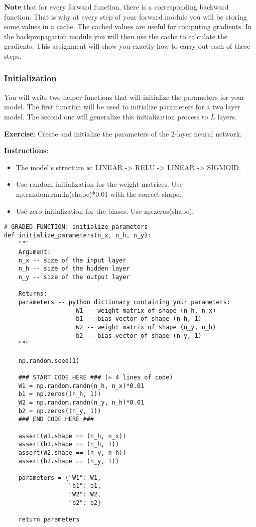 {\textbf {Note}} that for every forward function, there is a corresponding backward function. That is why at every step of your forward module you will be storing some values in a cache. The cached values are useful for computing gradients. In the backpropagation module you will then use the cache to calculate the gradients. This assignment will show you exactly how to carry out each of these steps.



\subsubsection{Initialization}

You will write two helper functions that will initialize the parameters for your model. The first function will be used to initialize parameters for a two layer model. The second one will generalize this initialization process to  $L$ layers.


{\textbf {Exercise}}: Create and initialize the parameters of the 2-layer neural network.

{\textbf {Instructions}}:
\begin{itemize}
\item The model's structure is: LINEAR -> RELU -> LINEAR -> SIGMOID.
\item Use random initialization for the weight matrices. Use np.random.randn(shape)*0.01 with the correct shape.
\item Use zero initialization for the biases. Use np.zeros(shape).
\end{itemize}

\begin{verbatim}
# GRADED FUNCTION: initialize_parameters
def initialize_parameters(n_x, n_h, n_y):
    """
    Argument:
    n_x -- size of the input layer
    n_h -- size of the hidden layer
    n_y -- size of the output layer
    
    Returns:
    parameters -- python dictionary containing your parameters:
                    W1 -- weight matrix of shape (n_h, n_x)
                    b1 -- bias vector of shape (n_h, 1)
                    W2 -- weight matrix of shape (n_y, n_h)
                    b2 -- bias vector of shape (n_y, 1)
    """
    
    np.random.seed(1)
    
    ### START CODE HERE ### (≈ 4 lines of code)
    W1 = np.random.randn(n_h, n_x)*0.01
    b1 = np.zeros((n_h, 1))
    W2 = np.random.randn(n_y, n_h)*0.01
    b2 = np.zeros((n_y, 1))
    ### END CODE HERE ###
    
    assert(W1.shape == (n_h, n_x))
    assert(b1.shape == (n_h, 1))
    assert(W2.shape == (n_y, n_h))
    assert(b2.shape == (n_y, 1))
    
    parameters = {"W1": W1,
                  "b1": b1,
                  "W2": W2,
                  "b2": b2}
    
    return parameters
\end{verbatim}


